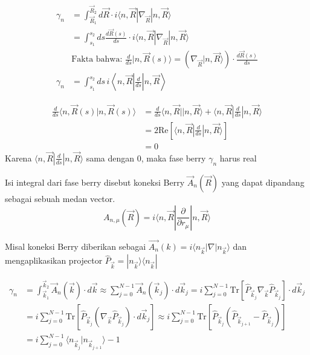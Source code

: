 \begin{align}
\gamma_n &= \int_{\vec{R}_1}^{\vec{R}_2} d\vec{R} \cdot i \langle n, \vec{R} | \nabla_{\vec{R}} | n, \vec{R} \rangle \\
&= \int_{s_1}^{s_2} ds \frac{d\vec{R}(s)}{ds} \cdot i \langle n, \vec{R} | \nabla_{\vec{R}} | n, \vec{R} \rangle \\
&\text{Fakta bahwa: } \frac{d}{ds} | n, \vec{R}(s) \rangle = \left( \nabla_{\vec{R}} | n, \vec{R} \rangle \right) \cdot \frac{d\vec{R}(s)}{ds} \\
\gamma_n &= \int_{s_1}^{s_2} ds \, i \left\langle n, \vec{R} \right| \frac{d}{ds} \left| n, \vec{R} \right\rangle
\end{align}

 \quad 
{} \quad 
{}

\begin{align*}
\frac{d}{ds} \langle n, \vec{R}(s) | n, \vec{R}(s) \rangle &= \frac{d}{ds} \langle n, \vec{R} | | n, \vec{R} \rangle + \langle n, \vec{R} | \frac{d}{ds} | n, \vec{R} \rangle \\
&= 2\text{Re} \left[ \langle n, \vec{R} | \frac{d}{ds} | n, \vec{R} \rangle \right] \\ 
&= 0
\end{align*}
Karena $\langle n, \vec{R} | \frac{d}{ds} | n, \vec{R} \rangle$ sama dengan 0, maka fase berry $\gamma_n$ harus real
\par 
Isi integral dari fase berry disebut koneksi Berry $\vec{A}_n(\vec{R})$ yang dapat dipandang sebagai sebuah medan vector.
\begin{equation}
  A_{n, \mu}(\vec{R}) = i \langle n, \vec{R} | \frac{\partial}{\partial r_\mu} | n, \vec{R} \rangle
\end{equation}

Misal koneksi Berry diberikan sebagai $\vec{A_n}(k) = i \langle n_{\vec{k}} | \nabla | n_{\vec{k}} \rangle$ dan mengaplikasikan projector $\hat{P}_{\vec{k}} = | n_{\vec{k}} \rangle \langle n_{\vec{k}} |$

 \quad 
{}

\begin{align*}
\gamma_n &= \int_{\vec{k}_1}^{\vec{k}_2} \vec{A}_n(\vec{k}) \cdot d\vec{k} \approx \sum_{j=0}^{N-1} \vec{A}_n(\vec{k}_j) \cdot d\vec{k}_j = i \sum_{j=0}^{N-1} \text{Tr} [\hat{P}_{\vec{k}_j} \nabla_{\vec{k}} \hat{P}_{\vec{k}_j}] \cdot d\vec{k}_j \\
&= i \sum_{j=0}^{N-1} \text{Tr} [\hat{P}_{\vec{k}_j} (\nabla_{\vec{k}} \hat{P}_{\vec{k}_j}) \cdot d\vec{k}_j] \approx i \sum_{j=0}^{N-1} \text{Tr} [\hat{P}_{\vec{k}_j} (\hat{P}_{\vec{k}_{j+1}} - \hat{P}_{\vec{k}_j})] \\
&= i \sum_{j=0}^{N-1} \langle n_{\vec{k}_j} | n_{\vec{k}_{j+1}} \rangle - 1
\end{align*}

